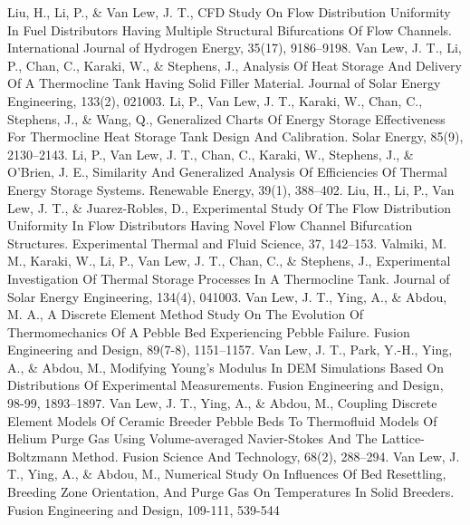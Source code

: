  {Liu, H., Li, P., \& Van Lew, J. T., CFD Study On Flow Distribution Uniformity In Fuel Distributors Having Multiple Structural Bifurcations Of Flow Channels. International Journal of Hydrogen Energy, 35(17), 9186–9198.}
 {Van Lew, J. T., Li, P., Chan, C., Karaki, W., \& Stephens, J., Analysis Of Heat Storage And Delivery Of A Thermocline Tank Having Solid Filler Material. Journal of Solar Energy Engineering, 133(2), 021003.}
 {Li, P., Van Lew, J. T., Karaki, W., Chan, C., Stephens, J., \& Wang, Q., Generalized Charts Of Energy Storage Effectiveness For Thermocline Heat Storage Tank Design And Calibration. Solar Energy, 85(9), 2130–2143.}
 {Li, P., Van Lew, J. T., Chan, C., Karaki, W., Stephens, J., \& O’Brien, J. E., Similarity And Generalized Analysis Of Efficiencies Of Thermal Energy Storage Systems. Renewable Energy, 39(1), 388–402.}
 {Liu, H., Li, P., Van Lew, J. T., \& Juarez-Robles, D., Experimental Study Of The Flow Distribution Uniformity In Flow Distributors Having Novel Flow Channel Bifurcation Structures. Experimental Thermal and Fluid Science, 37, 142–153.}
 {Valmiki, M. M., Karaki, W., Li, P., Van Lew, J. T., Chan, C., \& Stephens, J., Experimental Investigation Of Thermal Storage Processes In A Thermocline Tank. Journal of Solar Energy Engineering, 134(4), 041003.}
 {Van Lew, J. T., Ying, A., \& Abdou, M. A., A Discrete Element Method Study On The Evolution Of Thermomechanics Of A Pebble Bed Experiencing Pebble Failure. Fusion Engineering and Design, 89(7-8), 1151–1157.}
 {Van Lew, J. T., Park, Y.-H., Ying, A., \& Abdou, M., Modifying Young’s Modulus In DEM Simulations Based On Distributions Of Experimental Measurements. Fusion Engineering and Design, 98-99, 1893–1897.}
 {Van Lew, J. T., Ying, A., \& Abdou, M., Coupling Discrete Element Models Of Ceramic Breeder Pebble Beds To Thermofluid Models Of Helium Purge Gas Using Volume-averaged Navier-Stokes And The Lattice-Boltzmann Method. Fusion Science And Technology, 68(2), 288–294.}
 {Van Lew, J. T., Ying, A., \& Abdou, M., Numerical Study On Influences Of Bed Resettling, Breeding Zone Orientation, And Purge Gas On Temperatures In Solid Breeders. Fusion Engineering and Design, 109-111, 539-544}